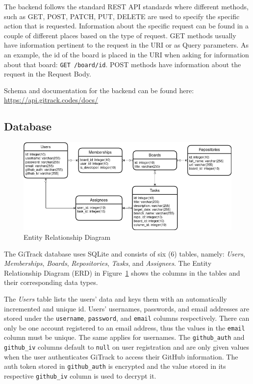 \documentclass{article}
\def\code#1{\texttt{#1}}
\begin{document}
The backend follows the standard REST API standards where different methods,
such as GET, POST, PATCH, PUT, DELETE are used to specify the specific action
that is requested. Information about the specific request can be found in a
couple of different places based on the type of request. GET methods usually
have information pertinent to the request in the URI or as Query parameters. As
an example, the id of the board is placed in the URI when asking for information
about that board: \code{GET /board/{id}}. POST methods have information about
the request in the Request Body.

Schema and documentation for the backend can be found here:
\url{https://api.gitrack.codes/docs/}

\subsection{Database}

\begin{figure}[H]
	\includegraphics[width=1\textwidth]{erd}\par\vspace{0.5cm}
	\caption{Entity Relationship Diagram}
	\label{fig:erd}
\end{figure}
The GiTrack database uses SQLite and consists of six (6) tables, namely:
\emph{Users}, \emph{Memberships}, \emph{Boards}, \emph{Repositories},
\emph{Tasks}, and \emph{Assignees}. The Entity Relationship Diagram (ERD) in
Figure~\ref{fig:erd} shows the columns in the tables and their corresponding
data types.

The \emph{Users} table lists the users’ data and keys them with an automatically
incremented and unique id. Users’ usernames, passwords, and email addresses are
stored under the \code{username}, \code{password}, and \code{email} columns
respectively. There can only be one account registered to an email address, thus
the values in the \code{email} column must be unique. The same applies for
usernames. The \code{github\_auth} and \code{github\_iv} columns default to
\code{null} on user registration and are only given values when the user
authenticates GiTrack to access their GitHub information. The auth token stored
in \code{github\_auth} is encrypted and the value stored in its respective
\code{github\_iv} column is used to decrypt it.
\end{document}
